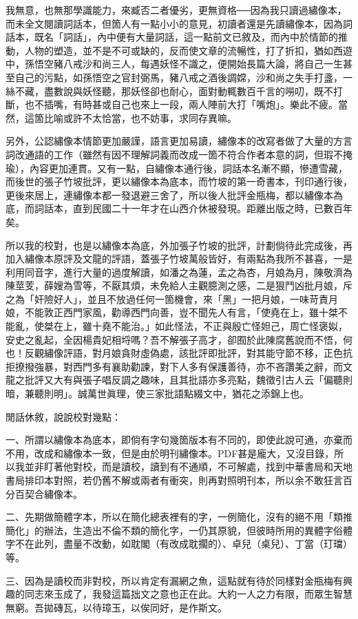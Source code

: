 我無意，也無那學識能力，來臧否二者優劣，更無資格──因為我只讀過繡像本，而未全文閱讀詞話本，但箇人有一點小小的意見，初讀者還是先讀繡像本，因為詞話本，既名「詞話」，內中便有大量詞話，這一點前文已敘及，而內中於情節的推動，人物的塑造，並不是不可或缺的，反而使文章的流暢性，打了折扣，猶如西遊中，孫悟空豬八戒沙和尚三人，每遇妖怪不識之，便開始長篇大論，將自己一生甚至自己的污點，如孫悟空之官封弼馬，豬八戒之酒後調嫦，沙和尚之失手打盞，一絲不藏，盡數說與妖怪聽，那妖怪卻也耐心，面對動輒數百千言的嘮叨，既不打斷，也不插嘴，有時甚或自己也來上一段，兩人陣前大打「嘴炮」。樂此不疲。當然，這箇比喻或許不太恰當，也不妨事，求同存異嘛。

另外，公認繡像本情節更加嚴謹，語言更加易讀，繡像本的改寫者做了大量的方言詞改通語的工作（雖然有因不理解詞義而改成一箇不符合作者本意的詞，但瑕不掩瑜），內容更加連貫。又有一點，自繡像本通行後，詞話本名漸不顯，慘遭雪藏，而後世的張子竹坡批評，更以繡像本為底本，而竹坡的第一奇書本，刊印通行後，更後來居上，連繡像本都一發退避三舍了，所以後人批評金瓶梅，都以繡像本為底，而詞話本，直到民國二十一年才在山西介休被發現。距離出版之時，已數百年矣。

所以我的校對，也是以繡像本為底，外加張子竹坡的批評，計劃倘待此完成後，再加入繡像本原評及文龍的評語，蓋張子竹坡萬般皆好，有兩點為我所不甚喜，一是利用同音字，進行大量的過度解讀，如潘之為蓮，孟之為杏，月娘為月，陳敬濟為陳莖芰，薛嫂為雪等，不厭其煩，未免給人主觀臆測之感，二是狠鬥凶批月娘，斥之為「奸險好人」，並且不放過任何一箇機會，來「黑」一把月娘，一味苛責月娘，不能敦正西門家風，勸導西門向善，豈不聞先人有言，「使堯在上，雖十桀不能亂，使桀在上，雖十堯不能治。」如此怪法，不正與殷亡怪妲己，周亡怪褒姒，安史之亂起，全因楊貴妃相埒嗎？吾不解張子高才，卻囿於此陳腐舊說而不悟，何也！反觀繡像評語，對月娘貪財虛偽處，該批評即批評，對其能守節不移，正色抗拒撩撥強暴，對西門多有襄助勸諫，對下人多有保護善待，亦不吝讚美之辭，而文龍之批評又大有與張子唱反調之趣味，且其批語亦多亮點，魏徵引古人云「偏聽則暗，兼聽則明」。誠萬世眞理，使三家批語點綴文中，猶花之添錦上也。

閒話休敘，說說校對幾點：

一、所謂以繡像本為底本，即倘有字句幾箇版本有不同的，即使此說可通，亦棄而不用，改成和繡像本一致，但是由於明刊繡像本。PDF甚是龐大，又沒目錄，所以我並非盯著他對校，而是讀校，讀到有不通順，不可解處，找到中華書局和天地書局排印本對照，若仍舊不解或兩者有衝突，則再對照明刊本，所以余不敢狂言百分百契合繡像本。

二、先期做簡體字本，所以在簡化總表裡有的字，一例簡化，沒有的絕不用「類推簡化」的辦法，生造出不倫不類的簡化字，一仍其原貌，但彼時所用的異體字俗體字不在此列，盡量不改動，如耽閣（有改成耽擱的）、卓兒（桌兒）、丁當（玎璫）等。

三、因為是讀校而非對校，所以肯定有漏網之魚，這點就有待於同樣對金瓶梅有興趣的同志來玉成了，我發這篇拙文之意也正在此。大約一人之力有限，而眾生智慧無窮。吾拋磚瓦，以待璋玉，以俟同好，是作斯文。

\begin{quotation}
\end{quotation}
